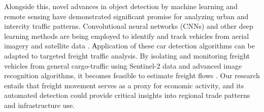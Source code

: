 
Alongside this, novel advances in object detection by machine learning and remote sensing have demonstrated significant promise for analyzing urban and intercity traffic patterns. Convolutional neural networks (CNNs) and other deep learning methods are being employed to identify and track vehicles from aerial imagery and satellite data \parencite{leitloff2006automatic, zambanini2020detection}. Аpplication of these car detection algorithms can be adapted to targeted freight traffic analysis. By isolating and monitoring freight vehicles from general cargo-traffic using Sentinel-2 data and advanced image recognition algorithms, it becomes feasible to estimate freight flows \parencite{fisser2022detecting}. Our research entails that freight movement serves as a proxy for economic activity, and its automated detection could provide critical insights into regional trade patterns and infrastructure use.
